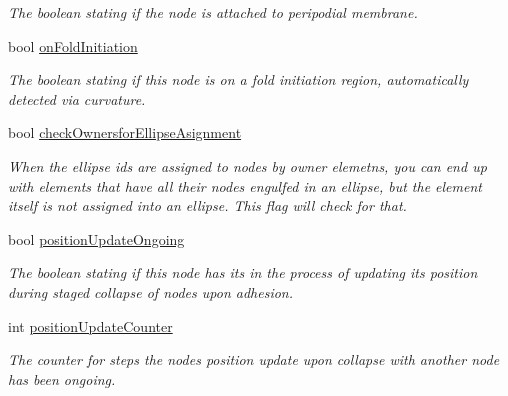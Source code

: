 \begin{DoxyCompactItemize}
\begin{DoxyCompactList}\small\item\em The boolean stating if the node is attached to peripodial membrane. \end{DoxyCompactList}\item 
\hypertarget{classNode_a913bf9335efdbd81a352b1ef80654f95}{}bool \hyperlink{classNode_a913bf9335efdbd81a352b1ef80654f95}{on\+Fold\+Initiation}\label{classNode_a913bf9335efdbd81a352b1ef80654f95}

\begin{DoxyCompactList}\small\item\em The boolean stating if this node is on a fold initiation region, automatically detected via curvature. \end{DoxyCompactList}\item 
\hypertarget{classNode_ad41abb2d4571366c2ba8d3a0b46798b6}{}bool \hyperlink{classNode_ad41abb2d4571366c2ba8d3a0b46798b6}{check\+Ownersfor\+Ellipse\+Asignment}\label{classNode_ad41abb2d4571366c2ba8d3a0b46798b6}

\begin{DoxyCompactList}\small\item\em When the ellipse ids are assigned to nodes by owner elemetns, you can end up with elements that have all their nodes engulfed in an ellipse, but the element itself is not assigned into an ellipse. This flag will check for that. \end{DoxyCompactList}\item 
\hypertarget{classNode_acf1e1353abc605a027ca492f44cd15bf}{}bool \hyperlink{classNode_acf1e1353abc605a027ca492f44cd15bf}{position\+Update\+Ongoing}\label{classNode_acf1e1353abc605a027ca492f44cd15bf}

\begin{DoxyCompactList}\small\item\em The boolean stating if this node has its in the process of updating its position during staged collapse of nodes upon adhesion. \end{DoxyCompactList}\item 
\hypertarget{classNode_ac19c4820651632467a0d7f913f002b56}{}int \hyperlink{classNode_ac19c4820651632467a0d7f913f002b56}{position\+Update\+Counter}\label{classNode_ac19c4820651632467a0d7f913f002b56}

\begin{DoxyCompactList}\small\item\em The counter for steps the nodes position update upon collapse with another node has been ongoing. \end{DoxyCompactList}\end{DoxyCompactItemize}


